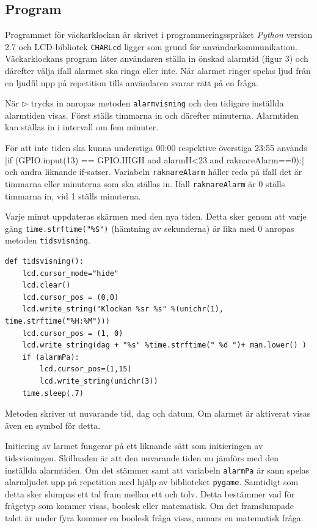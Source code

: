 \subsection{Program}
Programmet för väckarklockan är skrivet i programmeringsspråket \emph{Python} version 2.7 och LCD-bibliotek \texttt{CHARLcd} ligger som grund för användar\-kommunikation. Väckarklockans program låter användaren ställa in önskad alarmtid (figur 3) och därefter välja ifall alarmet ska ringa eller inte. När alarmet ringer spelas ljud från en ljudfil upp på repetition tills användaren svarar rätt på en fråga. 

När $\triangleright$ trycks in anropas metoden \verb|alarmvisning| och den tidigare inställda alarmtiden visas. Först ställs timmarna in och därefter minuterna. Alarmtiden kan ställas in i intervall om fem minuter. 

För att  inte tiden ska kunna understiga 00:00 respektive överstiga 23:55 används 
\small{|if (GPIO.input(13) == GPIO.HIGH and alarmH<23 and raknareAlarm==0):| }
\normalsize \noindent och andra liknande if-satser. Variabeln \verb|raknareAlarm| håller reda på ifall det är timmarna eller minuterna som ska ställas in. Ifall \verb|raknareAlarm| är 0 ställs timmarna in, vid 1 ställs minuterna. 

Varje minut uppdateras skärmen med den nya tiden. Detta sker genom att varje gång \texttt{time.strftime("\%S")} (hämtning av sekunderna) är lika med 0 anropas metoden \texttt{tidsvisning}. 
\begin{verbatim}
def tidsvisning():
    lcd.cursor_mode="hide"
    lcd.clear()
    lcd.cursor_pos = (0,0)
    lcd.write_string("Klockan %sr %s" %(unichr(1), time.strftime("%H:%M")))
    lcd.cursor_pos = (1, 0)
    lcd.write_string(dag + "%s" %time.strftime(" %d ")+ man.lower() )
    if (alarmPa):
        lcd.cursor_pos=(1,15)
        lcd.write_string(unichr(3))
    time.sleep(.7)
    \end{verbatim}
Metoden skriver ut nuvarande tid, dag och datum. Om alarmet är aktiverat visas även en symbol för detta.

Initiering av larmet fungerar på ett liknande sätt som initieringen av tidsvisningen. Skillnaden är att den nuvarande tiden nu jämförs med den inställda alarmtiden. Om det stämmer samt att variabeln \texttt{alarmPa} är sann spelas alarmljudet upp på repetition med hjälp av biblioteket \texttt{pygame}. Samtidigt som detta sker slumpas ett tal fram mellan ett och tolv. Detta bestämmer vad för frågetyp som kommer visas, boolesk eller matematisk. Om det framslumpade talet är under fyra kommer en boolesk fråga visas, annars en matematisk fråga. 


